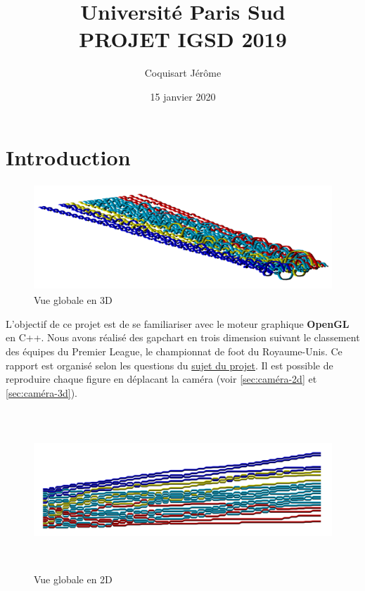 \documentclass[a4paper,10.5pt]{report}
\title{\textbf{\Huge  Université Paris Sud}\\ PROJET IGSD 2019}
\author{Coquisart Jérôme}
\date{15 janvier 2020}
\begin{document}
    \maketitle
    \newpage
    \tableofcontents
    \newpage

    \chapter*{Introduction}

    \begin{figure}[h!]
        \centering
        \includegraphics[height=4cm]{../main2.png}
        \caption{Vue globale en 3D}
    \end{figure}
    L'objectif de ce projet est de se familiariser avec le moteur graphique \textbf{OpenGL} en C++.
    Nous avons réalisé des gapchart en trois dimension suivant le classement des équipes du Premier League, le championnat de foot du Royaume-Unis.
    Ce rapport est organisé selon les questions du \href{http://vernier.frederic.free.fr/Teaching/IGSD/Projet2019-3gGapchart.pdf}{sujet du projet}.
    Il est possible de reproduire chaque figure en déplacant la caméra (voir \ref{sec:caméra-2d} et \ref{sec:caméra-3d}).

    \begin{figure}[h!]
        \centering
        \includegraphics[width=13cm, height=6cm]{../main.png}
        \caption{Vue globale en 2D}
    \end{figure}
\end{document}
